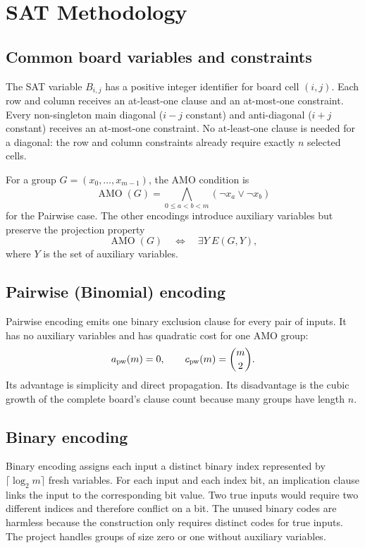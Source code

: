 \documentclass[a4paper,fleqn]{cas-sc}
\begin{document}
\section{SAT Methodology}

\subsection{Common board variables and constraints}
The SAT variable $B_{i,j}$ has a positive integer identifier for board cell
$(i,j)$. Each row and column receives an at-least-one clause and an at-most-one
constraint. Every non-singleton main diagonal ($i-j$ constant) and
anti-diagonal ($i+j$ constant) receives an at-most-one constraint. No
at-least-one clause is needed for a diagonal: the row and column constraints
already require exactly $n$ selected cells.

For a group $G=(x_0,\ldots,x_{m-1})$, the AMO condition is
\[
  \operatorname{AMO}(G)=\bigwedge_{0\le a<b<m}(\lnot x_a\lor\lnot x_b)
\]
for the Pairwise case. The other encodings introduce auxiliary variables but
preserve the projection property
\[
  \operatorname{AMO}(G)\quad\Longleftrightarrow\quad
  \exists Y\ E(G,Y),
\]
where $Y$ is the set of auxiliary variables.

\subsection{Pairwise (Binomial) encoding}
Pairwise encoding emits one binary exclusion clause for every pair of inputs.
It has no auxiliary variables and has quadratic cost for one AMO group:
\[
  a_{\rm pw}(m)=0,\qquad c_{\rm pw}(m)=\binom m2.
\]
Its advantage is simplicity and direct propagation. Its disadvantage is the
cubic growth of the complete board's clause count because many groups have
length $n$.

\subsection{Binary encoding}
Binary encoding assigns each input a distinct binary index represented by
$\lceil\log_2m\rceil$ fresh variables. For each input and each index bit, an
implication clause links the input to the corresponding bit value. Two true
inputs would require two different indices and therefore conflict on a bit.
The unused binary codes are harmless because the construction only requires
distinct codes for true inputs. The project handles groups of size zero or one
without auxiliary variables.
\end{document}
